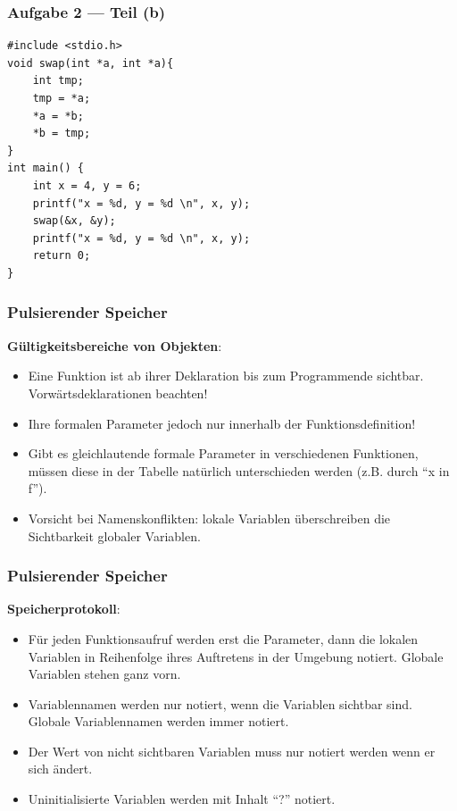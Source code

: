 \documentclass{beamer}
\begin{document}
\begin{frame}[fragile] \frametitle{Aufgabe 2 --- Teil (b)}
\begin{lstlisting}
#include <stdio.h>
void swap(int *a, int *a){ 
	int tmp;
	tmp = *a; 
	*a = *b;
	*b = tmp;
}
int main() {
	int x = 4, y = 6;
	printf("x = %d, y = %d \n", x, y);
	swap(&x, &y);
	printf("x = %d, y = %d \n", x, y);
	return 0;
}
\end{lstlisting}
\end{frame}


\begin{frame} \frametitle{Pulsierender Speicher}
	\small
	\textbf{Gültigkeitsbereiche von Objekten}:
	\begin{itemize}
		\item Eine Funktion ist ab ihrer Deklaration bis zum Programmende sichtbar. Vorwärtsdeklarationen beachten!
		\item  Ihre formalen Parameter jedoch nur innerhalb der Funktionsdefinition!
		\item Gibt es gleichlautende formale Parameter in verschiedenen Funktionen, müssen diese in der Tabelle natürlich unterschieden werden (z.B. durch \enquote{x in f}).
		\item Vorsicht bei Namenskonflikten: lokale Variablen überschreiben die Sichtbarkeit globaler Variablen.
	\end{itemize}
\end{frame}

\begin{frame} \frametitle{Pulsierender Speicher}
	\small
	\textbf{Speicherprotokoll}:
	\begin{itemize}
		\item Für jeden Funktionsaufruf werden erst die Parameter, dann die lokalen Variablen in Reihenfolge ihres Auftretens in der Umgebung notiert. Globale Variablen stehen ganz vorn.
		\item Variablennamen werden nur notiert, wenn die Variablen sichtbar sind. Globale Variablennamen werden immer notiert.
		\item Der Wert von nicht sichtbaren Variablen muss nur notiert werden wenn er sich ändert.
		\item Uninitialisierte Variablen werden mit Inhalt \enquote{?} notiert.
	\end{itemize}
\end{frame}
\end{document}
